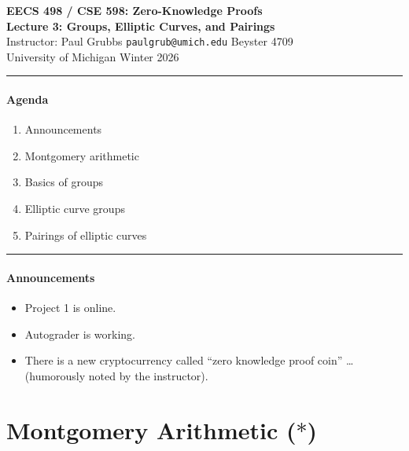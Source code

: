 \documentclass[11pt]{article}
\begin{document}

\begin{center}
  {\Large \textbf{EECS 498 / CSE 598: Zero-Knowledge Proofs}} \\[4pt]
  {\large \textbf{Lecture 3: Groups, Elliptic Curves, and Pairings}} \\[4pt]
  {\normalsize Instructor: Paul Grubbs \quad
   \texttt{paulgrub@umich.edu} \quad Beyster 4709} \\[2pt]
  {\normalsize University of Michigan \quad Winter 2026}
\end{center}

\medskip
\hrule
\medskip

\paragraph{Agenda}
\begin{enumerate}[label=(\arabic*)]
  \item Announcements
  \item Montgomery arithmetic
  \item Basics of groups
  \item Elliptic curve groups
  \item Pairings of elliptic curves
\end{enumerate}

\medskip
\hrule
\medskip

\paragraph{Announcements}
\begin{itemize}
  \item Project 1 is online.
  \item Autograder is working.
  \item There is a new cryptocurrency called ``zero knowledge proof coin'' \ldots
    (humorously noted by the instructor).
\end{itemize}

\section{Montgomery Arithmetic ($*$)}
\end{document}
